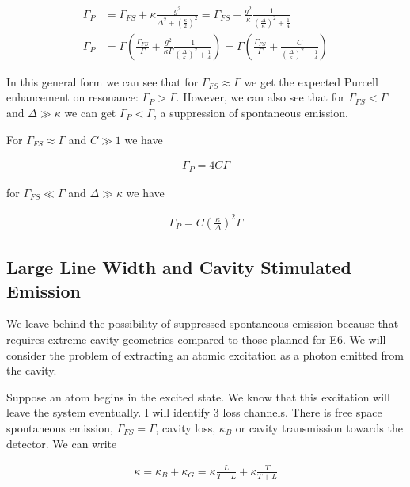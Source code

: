 \documentclass[12pt]{article}
\begin{document}
\begin{align}
\Gamma_P &= \Gamma_{FS} + \kappa \frac{g^2}{\Delta^2 + \left(\frac{\kappa}{2}\right)^2} = \Gamma_{FS} + \frac{g^2}{\kappa} \frac{1}{\left(\frac{\Delta}{\kappa}\right)^2 + \frac{1}{4}}\\
\Gamma_P &= \Gamma\left(\frac{\Gamma_{FS}}{\Gamma} + \frac{g^2}{\kappa \Gamma} \frac{1}{\left(\frac{\Delta}{\kappa} \right)^2 + \frac{1}{4}}\right) = \Gamma\left(\frac{\Gamma_{FS}}{\Gamma} + \frac{C}{\left(\frac{\Delta}{\kappa} \right)^2 + \frac{1}{4}}\right)
\end{align}

In this general form we can see that for $\Gamma_{FS} \approx \Gamma$ we get the expected Purcell enhancement on resonance: $\Gamma_P > \Gamma$. However, we can also see that for $\Gamma_{FS} < \Gamma$ and $\Delta \gg \kappa$ we can get $\Gamma_P < \Gamma$, a suppression of spontaneous emission.

For $\Gamma_{FS} \approx \Gamma$ and $C\gg1$ we have

\begin{align}
\Gamma_P = 4 C \Gamma
\end{align}

for $\Gamma_{FS}\ll \Gamma$ and $\Delta \gg \kappa$ we have

\begin{align}
\Gamma_P = C \left(\frac{\kappa}{\Delta}\right)^2 \Gamma
\end{align}

\subsection{Large Line Width and Cavity Stimulated Emission}

We leave behind the possibility of suppressed spontaneous emission because that requires extreme cavity geometries compared to those planned for E6. We will consider the problem of extracting an atomic excitation as a photon emitted from the cavity.

Suppose an atom begins in the excited state. We know that this excitation will leave the system eventually. I will identify 3 loss channels. There is free space spontaneous emission, $\Gamma_{FS} = \Gamma$, cavity loss, $\kappa_B$ or cavity transmission towards the detector. We can write

\begin{align}
\kappa = \kappa_B+\kappa_G = \kappa \frac{L}{T+L} + \kappa \frac{T}{T+L}
\end{align}
\end{document}
